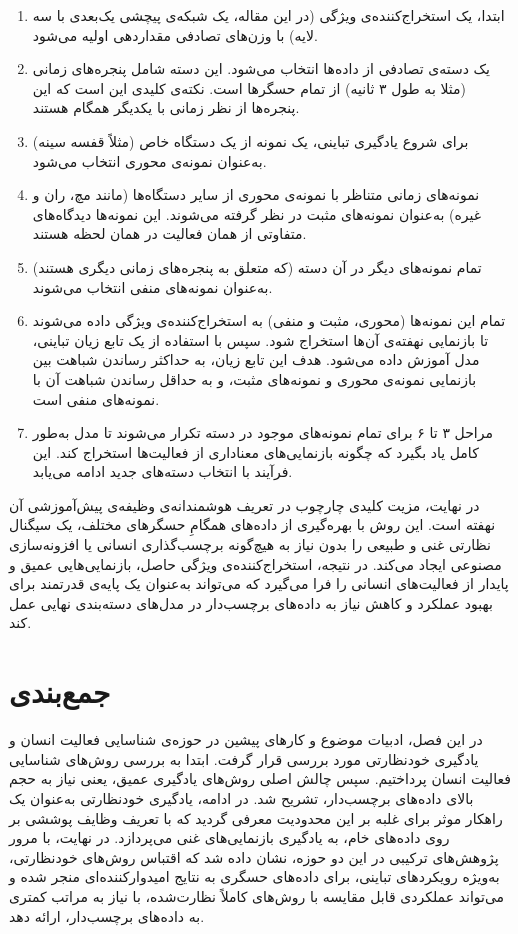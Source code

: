 \begin{enumerate}
\item ابتدا، یک استخراج‌کننده‌ی ویژگی (در این مقاله، یک شبکه‌ی پیچشی یک‌بعدی با سه لایه) با وزن‌های تصادفی مقداردهی اولیه می‌شود.
\item یک دسته‌ی تصادفی از داده‌ها انتخاب می‌شود. این دسته شامل پنجره‌های زمانی (مثلا به طول ۳ ثانیه) از تمام حسگرها است. نکته‌ی کلیدی این است که این پنجره‌ها از نظر زمانی با یکدیگر همگام هستند.
\item برای شروع یادگیری تباینی، یک نمونه از یک دستگاه خاص (مثلاً قفسه سینه) به‌عنوان نمونه‌ی محوری  انتخاب می‌شود.
\item نمونه‌های زمانی متناظر با نمونه‌ی محوری از سایر دستگاه‌ها (مانند مچ، ران و غیره) به‌عنوان نمونه‌های مثبت در نظر گرفته می‌شوند. این نمونه‌ها دیدگاه‌های متفاوتی از همان فعالیت در همان لحظه هستند.
\item تمام نمونه‌های دیگر در آن دسته (که متعلق به پنجره‌های زمانی دیگری هستند) به‌عنوان نمونه‌های منفی انتخاب می‌شوند.
\item تمام این نمونه‌ها (محوری، مثبت و منفی) به استخراج‌کننده‌ی ویژگی داده می‌شوند تا بازنمایی نهفته‌ی آن‌ها استخراج شود. سپس با استفاده از یک تابع زیان تباینی، مدل آموزش داده می‌شود. هدف این تابع زیان، به حداکثر رساندن شباهت بین بازنمایی نمونه‌ی محوری و نمونه‌های مثبت، و به حداقل رساندن شباهت آن با نمونه‌های منفی است.
\item مراحل ۳ تا ۶ برای تمام نمونه‌های موجود در دسته تکرار می‌شوند تا مدل به‌طور کامل یاد بگیرد که چگونه بازنمایی‌های معناداری از فعالیت‌ها استخراج کند. این فرآیند با انتخاب دسته‌های جدید ادامه می‌یابد.
\end{enumerate}

در نهایت، مزیت کلیدی چارچوب  در تعریف هوشمندانه‌ی وظیفه‌ی پیش‌آموزشی آن نهفته است. این روش با بهره‌گیری از داده‌های همگامِ حسگرهای مختلف، یک سیگنال نظارتی غنی و طبیعی را بدون نیاز به هیچ‌گونه برچسب‌گذاری انسانی یا افزونه‌سازی مصنوعی ایجاد می‌کند. در نتیجه، استخراج‌کننده‌ی ویژگی حاصل، بازنمایی‌هایی عمیق و پایدار از فعالیت‌های انسانی را فرا می‌گیرد که می‌تواند به‌عنوان یک پایه‌ی قدرتمند برای بهبود عملکرد و کاهش نیاز به داده‌های برچسب‌دار در مدل‌های دسته‌بندی نهایی عمل کند.

\section{جمع‌بندی}

در این فصل، ادبیات موضوع و کارهای پیشین در حوزه‌ی شناسایی فعالیت انسان و یادگیری خودنظارتی مورد بررسی قرار گرفت. ابتدا به بررسی روش‌های شناسایی فعالیت انسان پرداختیم. سپس چالش اصلی روش‌های یادگیری عمیق، یعنی نیاز به حجم بالای داده‌های برچسب‌دار، تشریح شد. در ادامه، یادگیری خودنظارتی به‌عنوان یک راهکار موثر برای غلبه بر این محدودیت معرفی گردید که با تعریف وظایف پوششی بر روی داده‌های خام، به یادگیری بازنمایی‌های غنی می‌پردازد. در نهایت، با مرور پژوهش‌های ترکیبی در این دو حوزه، نشان داده شد که اقتباس روش‌های خودنظارتی، به‌ویژه رویکردهای تباینی، برای داده‌های حسگری به نتایج امیدوارکننده‌ای منجر شده و می‌تواند عملکردی قابل مقایسه با روش‌های کاملاً نظارت‌شده، با نیاز به مراتب کمتری به داده‌های برچسب‌دار، ارائه دهد.
